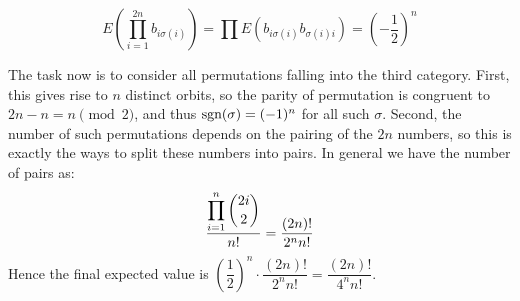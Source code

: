 \documentclass[11pt,a4paper]{article}
\newcommand{\<}{\langle}
\renewcommand{\>}{\rangle}
\begin{document}
\begin{enumerate}
\begin{enumerate}
		\[E(\prod_{i=1}^{2n}b_{i\sigma(i)})=\prod E(b_{i\sigma(i)}b_{\sigma(i)i})=\left(-\frac 12\right)^n\]
	\end{enumerate}
    The task now is to consider all permutations falling into the third category. First, this gives rise to $n$ distinct orbits, so the parity of permutation is congruent to $2n-n=n\pmod{2}$, and thus $\text{sgn}(\sigma)=(-1)^n$ for all such $\sigma$. Second, the number of such permutations depends on the pairing of the $2n$ numbers, so this is exactly the ways to split these numbers into pairs. In general we have the number of pairs as: 
    \[\frac{\displaystyle\prod_{i=1}^n\dbinom{2i}{2}}{n!}=\dfrac{(2n)!}{2^n n!}\]
    Hence the final expected value is $(\dfrac 12)^n \cdot \dfrac{(2n)!}{2^n n!}=\dfrac{(2n)!}{4^n n!}$. 
		
\end{enumerate}
\end{document}
